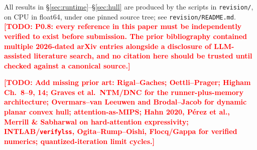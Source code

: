 \documentclass[11pt]{article}
\newcommand{\todo}[1]{\textcolor{red}{\textbf{[TODO: #1]}}}
\begin{document}
All results in \S\ref{sec:runtime}--\S\ref{sec:hull} are produced by the scripts
in \texttt{revision/}, on CPU in float64, under one pinned source tree; see
\texttt{revision/README.md}. \todo{P0.8: every reference in this paper must be
independently verified to exist before submission. The prior bibliography
contained multiple 2026-dated arXiv entries alongside a disclosure of
LLM-assisted literature search, and no citation here should be trusted until
checked against a canonical source.}

\todo{Add missing prior art: Rigal--Gaches; Oettli--Prager; Higham Ch.~8--9, 14;
Graves et al.\ NTM/DNC for the runner-plus-memory architecture; Overmars--van
Leeuwen and Brodal--Jacob for dynamic planar convex hull; attention-as-MIPS;
Hahn 2020, P\'erez et al., Merrill \& Sabharwal on hard-attention expressivity;
INTLAB/\texttt{verifylss}, Ogita--Rump--Oishi, Flocq/Gappa for verified numerics;
quantized-iteration limit cycles.}


% 
\end{document}
